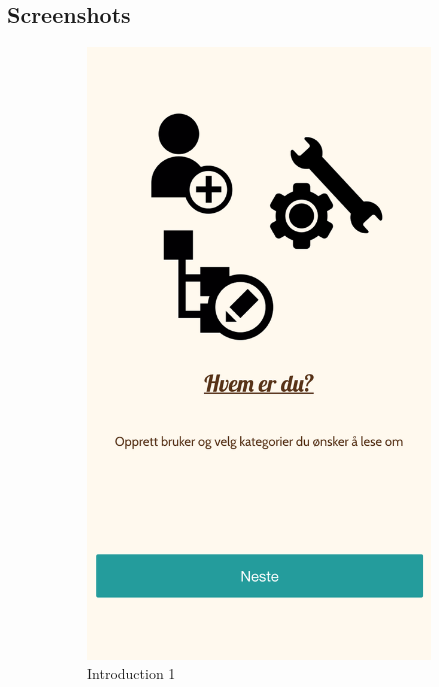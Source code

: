 \begin{appendices}
\chapter{Screenshots}
	\begin{figure}[h]
		\centering
		\begin{subfigure}[h]{0.3\textwidth}
			\includegraphics[width=\textwidth]{fig/screenshot_intro1}
			\caption{Introduction 1}
		\end{subfigure}
		\begin{subfigure}[h]{0.3\textwidth}

\end{subfigure}
\end{figure}
\end{appendices}
